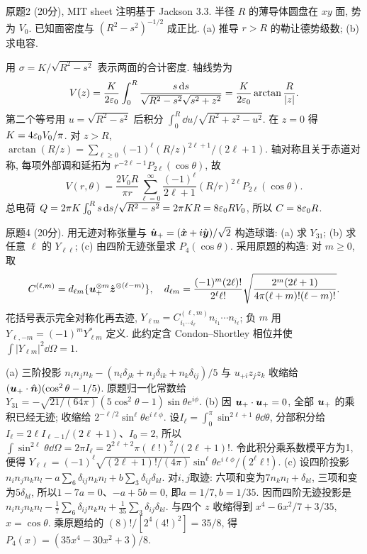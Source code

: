 \begin{exercise}
原题2 (20分), MIT sheet 注明基于 Jackson 3.3. 半径 $R$ 的薄导体圆盘在 $xy$ 面, 势为 $V_0$. 已知面密度与 $(R^2-s^2)^{-1/2}$ 成正比. (a) 推导 $r>R$ 的勒让德势级数; (b) 求电容.
\end{exercise}
\begin{solution}
用 $\sigma=K/\sqrt{R^2-s^2}$ 表示两面的合计密度. 轴线势为
\[
V(z)=\frac K{2\varepsilon_0}\int_0^R\frac{s\,\mathrm d s}{\sqrt{R^2-s^2}\sqrt{s^2+z^2}}
=\frac K{2\varepsilon_0}\arctan\frac R{|z|}.
\]
第二个等号用 $u=\sqrt{R^2-s^2}$ 后积分 $\int_0^R\dd u/\sqrt{R^2+z^2-u^2}$. 在 $z=0$ 得 $K=4\varepsilon_0 V_0/\pi$. 对 $z>R$, $\arctan(R/z)=\sum_{\ell\ge0}(-1)^\ell(R/z)^{2\ell+1}/(2\ell+1)$. 轴对称且关于赤道对称, 每项外部调和延拓为 $r^{-2\ell-1}P_{2\ell}(\cos\theta)$, 故
\[
V(r,\theta)=\frac{2V_0R}{\pi r}\sum_{\ell=0}^\infty\frac{(-1)^\ell}{2\ell+1}
(R/r)^{2\ell}P_{2\ell}(\cos\theta).
\]
总电荷 $Q=2\pi K\int_0^Rs\,\mathrm d s/\sqrt{R^2-s^2}=2\pi KR=8\varepsilon_0 RV_0$, 所以 $C=8\varepsilon_0 R$.
\end{solution}
\begin{exercise}
原题4 (20分). 用无迹对称张量与 $\hat{\boldsymbol{u}}_+=(\hat{\boldsymbol{x}}+i\hat{\boldsymbol{y}})/\sqrt2$ 构造球谐: (a) 求 $Y_{31}$; (b) 求任意 $\ell$ 的 $Y_{\ell\ell}$; (c) 由四阶无迹张量求 $P_4(\cos\theta)$. 采用原题的构造: 对 $m\ge0$, 取
\[
 C^{(\ell,m)}=d_{\ell m}\{\boldsymbol{u}_+^{\otimes m}\hat{\boldsymbol{z}}^{\otimes(\ell-m)}\},\quad
 d_{\ell m}=\frac{(-1)^m(2\ell)!}{2^\ell\ell!}
 \sqrt{\frac{2^m(2\ell+1)}{4\pi(\ell+m)!(\ell-m)!}}.
\]
花括号表示完全对称化再去迹, $Y_{\ell m}=C^{(\ell,m)}_{i_1\cdots i_\ell}n_{i_1}\cdots n_{i_\ell}$; 负 $m$ 用 $Y_{\ell,-m}=(-1)^mY_{\ell m}^*$ 定义. 此约定含 Condon--Shortley 相位并使 $\int|Y_{\ell m}|^2\dd\Omega=1$.
\end{exercise}
\begin{solution}
(a) 三阶投影 $n_in_jn_k-(n_i\delta_{jk}+n_j\delta_{ik}+n_k\delta_{ij})/5$ 与 $u_{+i}z_jz_k$ 收缩给 $(\boldsymbol{u}_+\cdot\hat{\boldsymbol{n}})(\cos^2\theta-1/5)$. 原题归一化常数给
$Y_{31}=-\sqrt{21/(64\pi)}(5\cos^2\theta-1)\sin\theta e^{i\phi}$.
(b) 因 $\boldsymbol{u}_+\cdot\boldsymbol{u}_+=0$, 全部 $\boldsymbol{u}_+$ 的乘积已经无迹; 收缩给 $2^{-\ell/2}\sin^\ell\theta e^{i\ell\phi}$. 设$I_\ell=\int_0^\pi\sin^{2\ell+1}\theta\dd\theta$, 分部积分给$I_\ell=2\ell I_{\ell-1}/(2\ell+1)$、$I_0=2$, 所以$\int\sin^{2\ell}\theta\dd\Omega=2\pi I_\ell=2^{2\ell+2}\pi(\ell!)^2/(2\ell+1)!$. 令此积分乘系数模平方为1, 便得
$Y_{\ell\ell}=(-1)^\ell\sqrt{(2\ell+1)!/(4\pi)}\sin^\ell\theta e^{i\ell\phi}/(2^\ell\ell!)$.
(c) 设四阶投影$n_in_jn_kn_l-a\sum_6\delta_{ij}n_kn_l+b\sum_3\delta_{ij}\delta_{kl}$. 对$i,j$取迹: 六项和变为$7n_kn_l+\delta_{kl}$, 三项和变为$5\delta_{kl}$, 所以$1-7a=0$、$-a+5b=0$, 即$a=1/7,b=1/35$. 因而四阶无迹投影是 $n_in_jn_kn_l-\frac17\sum_6\delta_{ij}n_kn_l+\frac1{35}\sum_3\delta_{ij}\delta_{kl}$. 与四个 $z$ 收缩得到 $x^4-6x^2/7+3/35$, $x=\cos\theta$. 乘原题给的 $(8)!/[2^4(4!)^2]=35/8$, 得 $P_4(x)=(35x^4-30x^2+3)/8$.
\end{solution}
